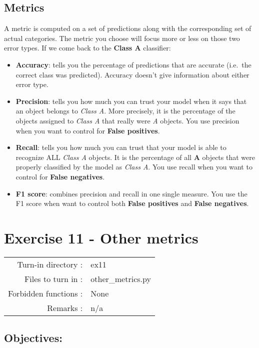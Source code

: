 \documentclass[]{article}
\begin{document}
\hypertarget{metrics}{%
\subsection{Metrics}\label{metrics}}

A metric is computed on a set of predictions along with the
corresponding set of actual categories. The metric you choose will focus
more or less on those two error types. If we come back to the
\textbf{Class A} classifier:

\begin{itemize}
\item
  \textbf{Accuracy}: tells you the percentage of predictions that are
  accurate (i.e.~the correct class was predicted). Accuracy doesn't give
  information about either error type.
\item
  \textbf{Precision}: tells you how much you can trust your model when
  it says that an object belongs to \emph{Class A}. More precisely, it
  is the percentage of the objects assigned to \emph{Class A} that
  really were \emph{A} objects. You use precision when you want to
  control for \textbf{False positives}.
\item
  \textbf{Recall}: tells you how much you can trust that your model is
  able to recognize ALL \emph{Class A} objects. It is the percentage of
  all \textbf{A} objects that were properly classified by the model as
  \emph{Class A}. You use recall when you want to control for
  \textbf{False negatives}.
\item
  \textbf{F1 score}: combines precision and recall in one single
  measure. You use the F1 score when want to control both \textbf{False
  positives} and \textbf{False negatives}.
\end{itemize}

\clearpage

\hypertarget{exercise-11---other-metrics-1}{%
\section{Exercise 11 - Other
metrics}\label{exercise-11---other-metrics-1}}

\begin{longtable}[]{@{}rl@{}}
\toprule
\endhead
Turn-in directory : & ex11\tabularnewline
Files to turn in : & other\_metrics.py\tabularnewline
Forbidden functions : & None\tabularnewline
Remarks : & n/a\tabularnewline
\bottomrule
\end{longtable}

\hypertarget{objectives-10}{%
\subsection{Objectives:}\label{objectives-10}}
\end{document}
